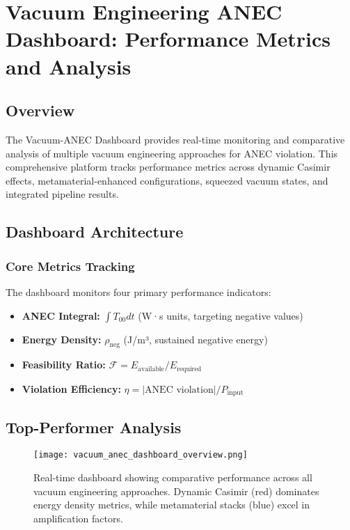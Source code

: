 \documentclass[11pt]{article}
\begin{document}
\section*{Vacuum Engineering ANEC Dashboard: Performance Metrics and Analysis}

\subsection*{Overview}
The Vacuum-ANEC Dashboard provides real-time monitoring and comparative analysis of multiple vacuum engineering approaches for ANEC violation. This comprehensive platform tracks performance metrics across dynamic Casimir effects, metamaterial-enhanced configurations, squeezed vacuum states, and integrated pipeline results.

\subsection*{Dashboard Architecture}
\subsubsection*{Core Metrics Tracking}
The dashboard monitors four primary performance indicators:
\begin{itemize}
  \item \textbf{ANEC Integral:} $\int T_{00} dt$ (W·s units, targeting negative values)
  \item \textbf{Energy Density:} $\rho_{\text{neg}}$ (J/m³, sustained negative energy)
  \item \textbf{Feasibility Ratio:} $\mathcal{F} = E_{\text{available}}/E_{\text{required}}$
  \item \textbf{Violation Efficiency:} $\eta = |\text{ANEC violation}|/P_{\text{input}}$
\end{itemize}

\subsection*{Top-Performer Analysis}

\begin{figure}[h]
  \centering
  \texttt{[image: vacuum\_anec\_dashboard\_overview.png]}
  \caption{Real-time dashboard showing comparative performance across all vacuum engineering approaches. Dynamic Casimir (red) dominates energy density metrics, while metamaterial stacks (blue) excel in amplification factors.}
  \label{fig:dashboard_overview}
\end{figure}
\end{document}
